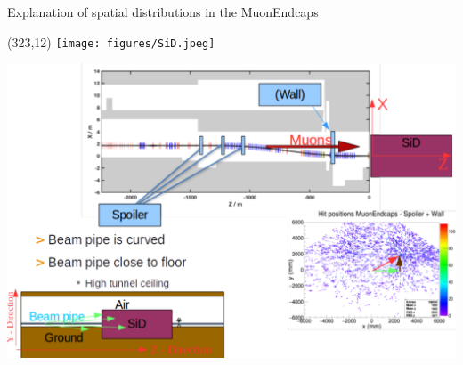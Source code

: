 \documentclass[xcolor={dvipsnames}]{beamer}
\newcommand{\sidlogo}{
  \setlength{\TPHorizModule}{1pt}
  \setlength{\TPVertModule}{1pt}
  \begin{textblock}{1}(323,12)
   \texttt{[image: figures/SiD.jpeg]}
  \end{textblock}
  }
\begin{document}
\begin{frame}{Explanation of spatial distributions \small in the MuonEndcaps}
\sidlogo
 \begin{center}
\includegraphics[height=0.85\textheight]{Explanation_Spatial_distribution.pdf}
\end{center}
\end{frame}
\end{document}
